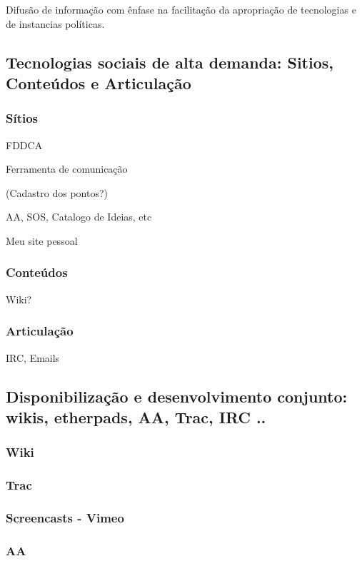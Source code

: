   Difusão de informação com ênfase na facilitação
  da apropriação de tecnologias e de instancias políticas.

      \subsection{Tecnologias sociais de alta demanda: Sitios, Conteúdos e Articulação}

      \subsubsection{Sítios}

      FDDCA

      Ferramenta de comunicação

      (Cadastro dos pontos?)

      AA, SOS, Catalogo de Ideias, etc

      Meu site pessoal


      \subsubsection{Conteúdos}

      Wiki?

      \subsubsection{Articulação}

      IRC, Emails

\subsection{Disponibilização e desenvolvimento conjunto: wikis, etherpads, AA, Trac, IRC ..}

\subsubsection{Wiki}

\subsubsection{Trac}

\subsubsection{Screencasts - Vimeo}

\subsubsection{AA}

